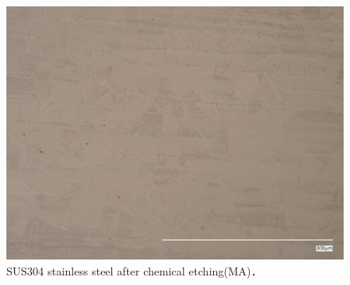 \begin{figure}[htbp]
    \centering %
    \includegraphics[width=100truemm,clip]{fig/241218_304MA_etching.jpg}
    \caption{SUS304 stainless steel after chemical etching(MA)．}
    \label{fig:304MAEtching}
\end{figure}


